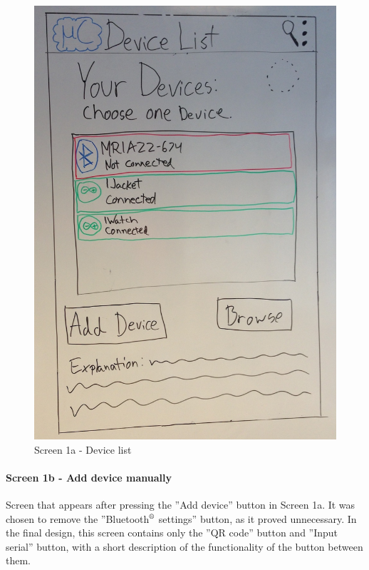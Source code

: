 \begin{figure}[H]
\centering
\includegraphics[scale=0.2]{images/Design_guide/Screen1a.png}
\caption{Screen 1a - Device list}
\end{figure}


\paragraph{Screen 1b - Add device manually}
Screen that appears after pressing the ''Add device'' button in Screen 1a. It was chosen to remove the ''Bluetooth$\textsuperscript{\textregistered}$ settings'' button, as it proved unnecessary. In the final design, this screen contains only the ''QR code'' button and ''Input serial'' button, with a short description of the functionality of the button between them.

